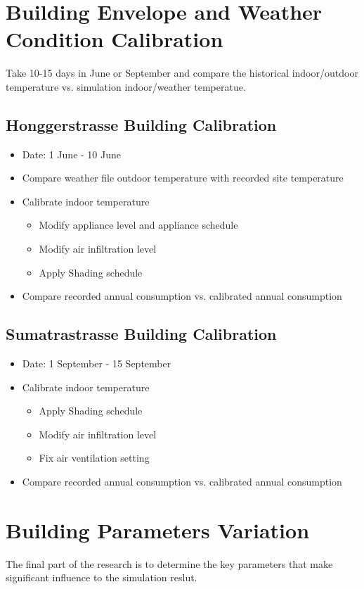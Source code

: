 \documentclass[11pt, a4paper]{article}
\theoremstyle{definition}
\begin{document}
\section{Building Envelope and Weather Condition Calibration}
	Take 10-15 days in June or September and compare the historical indoor/outdoor temperature vs. simulation indoor/weather temperatue.
	\subsection{Honggerstrasse Building Calibration}
		\begin{itemize}
			\item Date: 1 June - 10 June
			\item Compare weather file outdoor temperature with recorded site temperature
			\item Calibrate indoor temperature
				\begin{itemize}
					\item Modify appliance level and appliance schedule
					\item Modify air infiltration level
					\item Apply Shading schedule
				\end{itemize}
			\item Compare recorded annual consumption vs. calibrated annual consumption
		\end{itemize}
	
	\subsection{Sumatrastrasse Building Calibration}
		\begin{itemize}
			\item Date: 1 September - 15 September
			\item Calibrate indoor temperature
				\begin{itemize}
					\item Apply Shading schedule
					\item Modify air infiltration level
					\item Fix air ventilation setting
				\end{itemize}
			\item Compare recorded annual consumption vs. calibrated annual consumption
		\end{itemize}
		
\section{Building Parameters Variation}
	The final part of the research is to determine the key parameters that make significant influence to the simulation reslut. 
\end{document}
